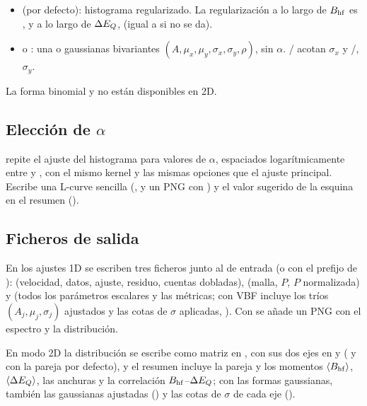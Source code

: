 \begin{itemize}[nosep]
  \item {} (por defecto): histograma regularizado. La
        regularización a lo largo de $B_{\mathrm{hf}}$ es , y a lo largo
        de $\Delta E_{Q}$,  (igual a  si no se
        da).
  \item {} o : una o 
        gaussianas bivariantes $(A, \mu_x, \mu_y, \sigma_x, \sigma_y, \rho)$,
        sin $\alpha$. / acotan
        $\sigma_x$ y /,
        $\sigma_y$.
\end{itemize}

La forma binomial y  no están disponibles en 2D.

\subsection{Elección de \texorpdfstring{$\alpha$}{alfa}}

 repite el ajuste del histograma para
 valores de $\alpha$, espaciados logarítmicamente entre
 y , con el mismo kernel y las mismas
opciones que el ajuste principal. Escribe una L-curve sencilla
(, y un PNG con ) y el valor sugerido de
la esquina en el resumen ().

\subsection{Ficheros de salida}

En los ajustes 1D se escriben tres ficheros junto al de entrada (o con el
prefijo de ):  (velocidad, datos,
ajuste, residuo, cuentas dobladas),  (malla, $P$, $P$
normalizada) y  (todos los parámetros escalares y las
métricas; con VBF incluye los tríos $(A_j,\mu_j,\sigma_j)$ ajustados y las
cotas de $\sigma$ aplicadas, ). Con
 se añade un PNG con el espectro y la distribución.

En modo 2D la distribución se escribe como matriz en
, con sus dos ejes en 
y  ( y 
con la pareja por defecto), y el resumen incluye la pareja y los momentos
$\langle B_{\mathrm{hf}}\rangle$, $\langle\Delta E_{Q}\rangle$, las anchuras y la correlación
$B_{\mathrm{hf}}$--$\Delta E_{Q}$; con las formas gaussianas, también las gaussianas ajustadas
() y las cotas de $\sigma$ de cada eje
().
